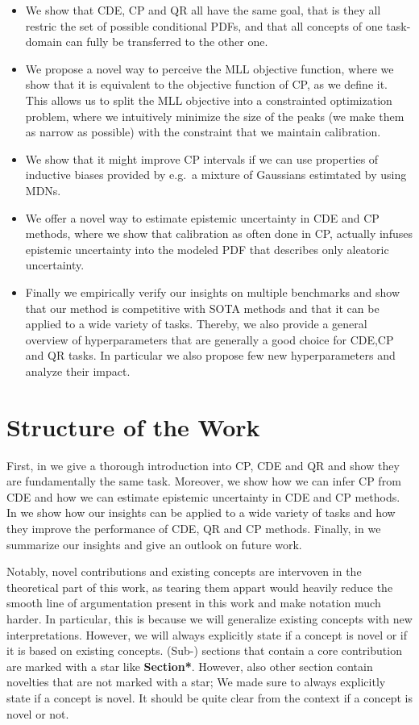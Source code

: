 \begin{itemize}
    \item We show that CDE, CP and QR all have the same goal, that is they all restric the set of possible conditional PDFs, and that all concepts of one task-domain can fully be transferred to the other one.
    \item We propose a novel way to perceive the MLL objective function, where we show that it is equivalent to the objective function of CP, as we define it. This allows us to split the MLL objective into a constrainted optimization problem, where we intuitively minimize the size of the peaks (we make them as narrow as possible) with the constraint that we maintain calibration.
    \item We show that it might improve CP intervals if we can use properties of inductive biases provided by e.g.\ a mixture of Gaussians estimtated by using MDNs.
    \item We offer a novel way to estimate epistemic uncertainty in CDE and CP methods, where we show that calibration as often done in CP, actually infuses epistemic uncertainty into the modeled PDF that describes only aleatoric uncertainty.
    \item Finally we empirically verify our insights on multiple benchmarks and show that our method is competitive with SOTA methods and that it can be applied to a wide variety of tasks. Thereby, we also provide a general overview of hyperparameters that are generally a good choice for CDE,CP and QR tasks. In particular we also propose few new hyperparameters and analyze their impact.
\end{itemize}

\section{Structure of the Work}\label{sec:structure}

First, in  we give a thorough introduction into CP, CDE and QR and show they are fundamentally the same task. Moreover, we show how we can infer CP from CDE and how we can estimate epistemic uncertainty in CDE and CP methods. In  we show how our insights can be applied to a wide variety of tasks and how they improve the performance of CDE, QR and CP methods. Finally, in  we summarize our insights and give an outlook on future work.

Notably, novel contributions and existing concepts are intervoven in the theoretical part of this work, as tearing them appart would heavily reduce the smooth line of argumentation present in this work and make notation much harder. In particular, this is because we will generalize existing concepts with new interpretations. However, we will always explicitly state if a concept is novel or if it is based on existing concepts. (Sub-) sections that contain a core contribution are marked with a star like \textbf{Section*}. However, also other section contain novelties that are not marked with a star; We made sure to always explicitly state if a concept is novel. It should be quite clear from the context if a concept is novel or not.

